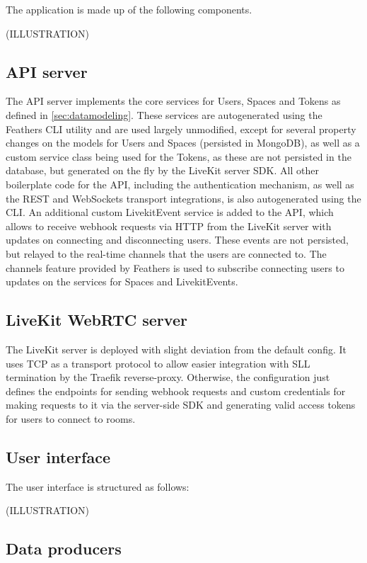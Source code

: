 The application is made up of the following components.

(ILLUSTRATION)


\subsection{API server}

The \ac{API} server implements the core services for Users, Spaces and Tokens as defined in \autoref{sec:datamodeling}. These services are autogenerated using the Feathers \ac{CLI} utility and are used largely unmodified, except for several property changes on the models for Users and Spaces (persisted in MongoDB), as well as a custom service class being used for the Tokens, as these are not persisted in the database, but generated on the fly by the LiveKit server \ac{SDK}. All other boilerplate code for the \ac{API}, including the authentication mechanism, as well as the REST and WebSockets transport integrations, is also autogenerated using the \ac{CLI}. An additional custom LivekitEvent service is added to the API, which allows to receive webhook requests via HTTP from the LiveKit server with updates on connecting and disconnecting users. These events are not persisted, but relayed to the real-time channels that the users are connected to. The channels feature provided by Feathers is used to subscribe connecting users to updates on the services for Spaces and LivekitEvents.

\subsection{LiveKit WebRTC server}

The LiveKit server is deployed with slight deviation from the default config. It uses TCP as a transport protocol to allow easier integration with SLL termination by the Traefik reverse-proxy. Otherwise, the configuration just defines the endpoints for sending webhook requests and custom credentials for making requests to it via the server-side \ac{SDK} and generating valid access tokens for users to connect to rooms.

\subsection{User interface}

The user interface is structured as follows:

(ILLUSTRATION)

\subsection{Data producers}

